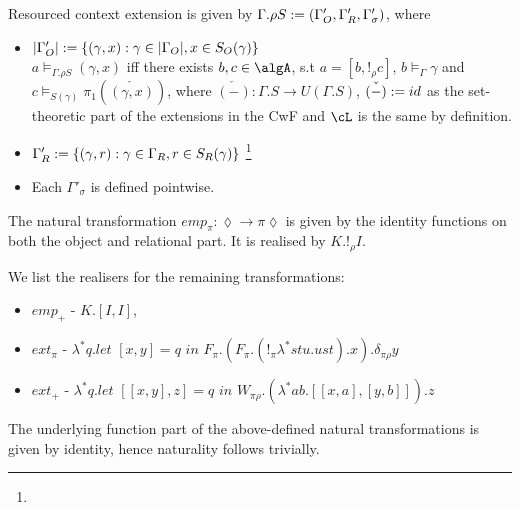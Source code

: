 \documentclass[12pt,a4paper]{article}
\renewcommand{\O}{_{O}}\alwaysmath{O}
\newcommand{\R}{\ensuremath{_{R}}}
\begin{document}
Resourced context extension is given by $\Gamma . \rho S \define (\Gamma'\O, \Gamma'\R, \Gamma'_\sigma)$, where
\begin{itemize}
  \item $|\Gamma'\O| \define \{(\gamma, x) : \gamma \in |\Gamma\O|, x \in S\O(\gamma) \}$\\
  $a \vDash_{\Gamma. \rho S} (\gamma, x)$ iff there exists $b, c \in \algA$, s.t $a = [b, !_\rho c]$, $b \vDash_{\Gamma} \gamma$ and $c \vDash_{S(\gamma)} \pi_1(\check{(\gamma, x)}) $, where $\check{(-)} : \Gamma . S \to U(\Gamma . S)$, $\check{(-)} := id$ as the set-theoretic part of the extensions in the CwF and $\cL$ is the same by definition.
  
  \item $\Gamma'\R \define \{(\gamma, r) : \gamma \in \Gamma\R, r \in S\R(\gamma)\}$ \footnote{}
  
  \item Each $\Gamma'_\sigma$ is defined pointwise.
\end{itemize}
            
The natural transformation $emp_\pi : \lozenge \to \pi \lozenge$ is given by the identity functions on both the object and relational part. It is realised by $K. !_\rho I$.

We list the realisers for the remaining transformations:
\begin{itemize}[noitemsep]
  \item $emp_+$ - $K . [I, I]$,
  \item $ext_\pi$ -  $\lambda^* q. \textit{let }[x, y] = q\textit{ in } F_\pi . (F_\pi. (!_\pi \lambda^* s t u. u s t) . x) . \delta_{\pi \rho} y$ 
  \item $ext_+$ - $\lambda^* q. \textit{let } [[x , y], z] = q \textit{ in } W_{\pi\rho}.(\lambda^* a b. [[x, a],  [y, b]]).z$
\end{itemize}
The underlying function part of the above-defined natural transformations is given by identity, hence naturality follows trivially.\\
\end{document}
